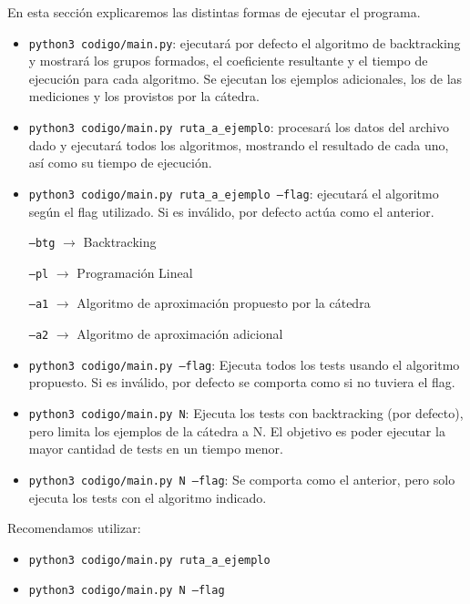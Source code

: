 \documentclass{article}
\begin{document}
En esta sección explicaremos las distintas formas de ejecutar el programa.
\begin{itemize}
    \item \texttt{python3\ codigo/main.py}: ejecutará por defecto el algoritmo de backtracking y mostrará los grupos formados, el coeficiente resultante y el tiempo de ejecución para cada algoritmo. Se ejecutan los ejemplos adicionales, los de las mediciones y los provistos por la cátedra. 
    \item \texttt{python3\ codigo/main.py\ ruta\_a\_ejemplo}: procesará los datos del archivo dado y ejecutará todos los algoritmos, mostrando el resultado de cada uno, así como su tiempo de ejecución. 
    \item \texttt{python3\ codigo/main.py ruta\_a\_ejemplo\ --flag}: ejecutará el algoritmo según el flag utilizado. Si es inválido, por defecto actúa como el anterior.

        \texttt{--btg} $\rightarrow$ Backtracking
        
        \texttt{--pl} $\rightarrow$ Programación Lineal
        
        \texttt{--a1} $\rightarrow$ Algoritmo de aproximación propuesto por la cátedra
        
        \texttt{--a2} $\rightarrow$ Algoritmo de aproximación adicional
    \item \texttt{python3\ codigo/main.py\ --flag}: Ejecuta todos los tests usando el algoritmo propuesto. Si es inválido, por defecto se comporta como si no tuviera el flag.

    \item \texttt{python3\ codigo/main.py\ N}: Ejecuta los tests con backtracking (por defecto), pero limita los ejemplos de la cátedra a N. El objetivo es poder ejecutar la mayor cantidad de tests en un tiempo menor.

    \item \texttt{python3\ codigo/main.py\ N\ --flag}: Se comporta como el anterior, pero solo ejecuta los tests con el algoritmo indicado.
        
\end{itemize}

Recomendamos utilizar:
\begin{itemize}
    \item \texttt{python3\ codigo/main.py\ ruta\_a\_ejemplo}
    \item \texttt{python3\ codigo/main.py\ N\ --flag}
\end{itemize}
\end{document}

